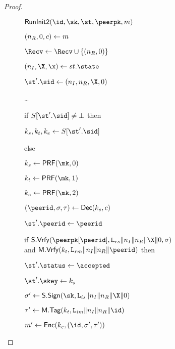 \begin{proof}
\begin{figure}[tp]
\begin{minipage}[t]{0.49\textwidth}
        \begin{oracle}{$\RunInit(\id,\sk,\st,\peerpk,m)$}
        \iffull
          \item $(\nonce_R,\Y,\ciph) \gets m$
          \item $\Recv \gets \Recv \cup \{(\nonce_R,\Y)\}$
          \item $(\nonce_I,\X,\x) \gets st.\state$
          \item $\st'.\sid \gets (\nonce_I,\nonce_R,\X,\Y)$
        \else
          \item \dots
        \fi
          \item if $\S[\st'.\sid] \neq \bot$ then
          \item \hindent $\ks,\kt,\ke \gets \S[\st'.\sid]$
          \item else
          \item \hindent \gamechange{$\mk\sample \bits^{\kl}$}
          \item \hindent {}
          \item \hindent \hindent {}
          \item \hindent {}
          \item \hindent $\ks \gets \PRF(\mk,0)$
          \item \hindent $\kt \gets \PRF(\mk,1)$
          \item \hindent $\ke \gets \PRF(\mk,2)$
        \iffull
          \item $(\peerid,\sigma, \tau) \gets \ENCDec(\ke,\ciph)$
          \item $\st'.\peerid \gets \peerid$
          \item if $\SIGScheme.\SIGVerify(\peerpk[\peerid], \labelrs\|\nonce_I\|\nonce_R\|\X\|\Y, \sigma)$\\
		and $\MACScheme.\MACVerify(\kt, \labelrm\|\nonce_I\|\nonce_R\|\peerid)$ then
          \item \hindent $\st'.\status \gets \accepted$
          \item \hindent $\st'.\skey \gets \ks$
          \item \hindent $\sigma' \gets \SIGScheme.\SIGSign(\sk, \labelis\|\nonce_I\|\nonce_R\|\X\|\Y)$
          \item \hindent $\tau' \gets \MACScheme.\MACTag(\kt, \labelim\|\nonce_I\|\nonce_R\|\id)$
          \item \hindent $m' \gets \ENCEnc(\ke,(\id, \sigma', \tau'))$

\end{oracle}
\end{minipage}
\end{figure}
\end{proof}
